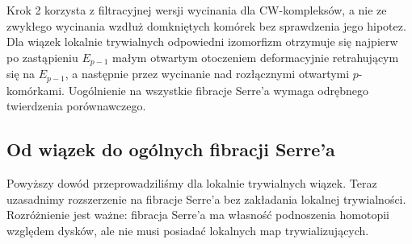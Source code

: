 \begin{uwaga}
Krok 2 korzysta z filtracyjnej wersji wycinania dla
CW-kompleksów, a nie ze zwykłego wycinania wzdłuż
domkniętych komórek bez sprawdzenia jego hipotez.
Dla wiązek lokalnie trywialnych odpowiedni izomorfizm
otrzymuje się najpierw po zastąpieniu $E_{p-1}$ małym
otwartym otoczeniem deformacyjnie retrahującym się
na $E_{p-1}$, a następnie przez wycinanie nad rozłącznymi
otwartymi $p$-komórkami. Uogólnienie na wszystkie fibracje
Serre'a wymaga odrębnego twierdzenia porównawczego.
\end{uwaga}

\subsection*{Od wiązek do ogólnych fibracji Serre'a}
Powyższy dowód przeprowadziliśmy dla lokalnie trywialnych wiązek.
Teraz uzasadnimy rozszerzenie na fibracje Serre'a bez zakładania
lokalnej trywialności. Rozróżnienie jest ważne: fibracja Serre'a
ma własność podnoszenia homotopii względem dysków, ale nie
musi posiadać lokalnych map trywializujących.

